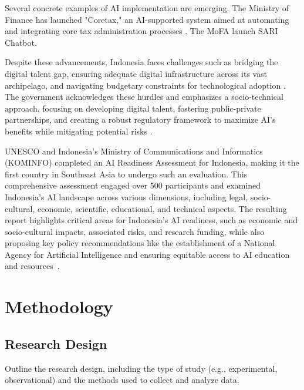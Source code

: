 \documentclass[12pt]{report}
\begin{document}
\begin{itemize}
    Several concrete examples of AI implementation are emerging. The Ministry of Finance has launched "Coretax," an AI-supported system aimed at automating and integrating core tax administration processes \cite{dipstrategy_fenomena_penerapan_ai}. The MoFA launch SARI Chatbot.

    Despite these advancements, Indonesia faces challenges such as bridging the digital talent gap, ensuring adequate digital infrastructure across its vast archipelago, and navigating budgetary constraints for technological adoption \cite{govinsider_navigating_ai_2025, mfat_indonesia_ai_strategy_2023}. The government acknowledges these hurdles and emphasizes a socio-technical approach, focusing on developing digital talent, fostering public-private partnerships, and creating a robust regulatory framework to maximize AI's benefits while mitigating potential risks \cite{govinsider_navigating_ai_2025, opengovasia_indonesia_ai_strategy_2025}.

    UNESCO and Indonesia's Ministry of Communications and Informatics (KOMINFO) completed an AI Readiness Assessment for Indonesia, making it the first country in Southeast Asia to undergo such an evaluation. This comprehensive assessment engaged over 500 participants and examined Indonesia's AI landscape across various dimensions, including legal, socio-cultural, economic, scientific, educational, and technical aspects. The resulting report highlights critical areas for Indonesia's AI readiness, such as economic and socio-cultural impacts, associated risks, and research funding, while also proposing key policy recommendations like the establishment of a National Agency for Artificial Intelligence and ensuring equitable access to AI education and resources~\cite{unescoina2024ai, unescoina2024aireport}.
    
\end{itemize}

\newpage

\chapter{Methodology}
\section{Research Design}
Outline the research design, including the type of study (e.g., experimental, observational) and the methods used to collect and analyze data.
\end{document}
